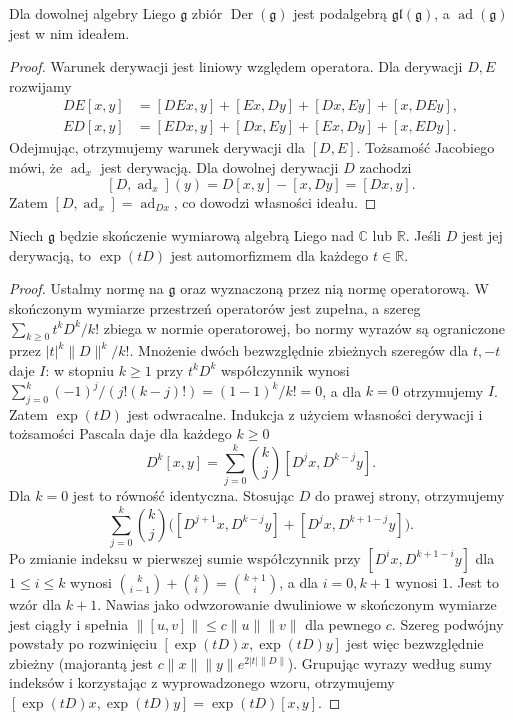 \begin{stwierdzenie}
\label{aa:prop:lie-derivations}
Dla dowolnej algebry Liego $\mathfrak g$ zbiór
$\operatorname{Der}(\mathfrak g)$ jest podalgebrą
$\mathfrak{gl}(\mathfrak g)$, a
$\operatorname{ad}(\mathfrak g)$ jest w nim ideałem.
\end{stwierdzenie}
\begin{proof}
Warunek derywacji jest liniowy względem operatora.
Dla derywacji $D,E$ rozwijamy
\[
\begin{aligned}
 DE[x,y]&=[DEx,y]+[Ex,Dy]+[Dx,Ey]+[x,DEy],\\
 ED[x,y]&=[EDx,y]+[Dx,Ey]+[Ex,Dy]+[x,EDy].
\end{aligned}
\]
Odejmując, otrzymujemy warunek derywacji dla $[D,E]$.
Tożsamość Jacobiego mówi, że $\operatorname{ad}_x$
jest derywacją. Dla dowolnej derywacji $D$ zachodzi
\[
 [D,\operatorname{ad}_x](y)=D[x,y]-[x,Dy]=[Dx,y].
\]
Zatem $[D,\operatorname{ad}_x]=\operatorname{ad}_{Dx}$,
co dowodzi własności ideału.
\end{proof}

\begin{stwierdzenie}
\label{aa:prop:exp-derivation}
Niech $\mathfrak g$ będzie skończenie wymiarową
algebrą Liego nad $\mathbb C$ lub $\mathbb R$.
Jeśli $D$ jest jej derywacją, to $\exp(tD)$ jest
automorfizmem dla każdego $t\in\mathbb R$.
\end{stwierdzenie}
\begin{proof}
Ustalmy normę na $\mathfrak g$ oraz wyznaczoną przez nią
normę operatorową. W skończonym wymiarze przestrzeń
operatorów jest zupełna, a szereg
$\sum_{k\ge0}t^kD^k/k!$ zbiega w normie operatorowej,
bo normy wyrazów są ograniczone przez
$|t|^k\|D\|^k/k!$. Mnożenie dwóch bezwzględnie
zbieżnych szeregów dla $t,-t$ daje $I$:
w stopniu $k\ge1$ przy $t^kD^k$ współczynnik wynosi
$\sum_{j=0}^k(-1)^j/(j!(k-j)!)=(1-1)^k/k!=0$,
a dla $k=0$ otrzymujemy $I$.
Zatem $\exp(tD)$ jest odwracalne.
Indukcja z użyciem własności derywacji i tożsamości
Pascala daje dla każdego $k\ge0$
\[
 D^k[x,y]=\sum_{j=0}^k\binom{k}{j}[D^jx,D^{k-j}y].
\]
Dla $k=0$ jest to równość identyczna. Stosując $D$
do prawej strony, otrzymujemy
\[
 \sum_{j=0}^k\binom{k}{j}
 \bigl([D^{j+1}x,D^{k-j}y]+[D^jx,D^{k+1-j}y]\bigr).
\]
Po zmianie indeksu w pierwszej sumie współczynnik
przy $[D^ix,D^{k+1-i}y]$ dla $1\le i\le k$
wynosi $\binom{k}{i-1}+\binom{k}{i}=\binom{k+1}{i}$,
a dla $i=0,k+1$ wynosi $1$. Jest to wzór dla $k+1$.
Nawias jako odwzorowanie dwuliniowe w skończonym
wymiarze jest ciągły i spełnia
$\|[u,v]\|\le c\|u\|\|v\|$ dla pewnego $c$.
Szereg podwójny powstały po rozwinięciu
$[\exp(tD)x,\exp(tD)y]$ jest więc bezwzględnie
zbieżny (majorantą jest $c\|x\|\|y\|e^{2|t|\|D\|}$).
Grupując wyrazy według sumy indeksów i korzystając
z wyprowadzonego wzoru, otrzymujemy
$[\exp(tD)x,\exp(tD)y]=\exp(tD)[x,y]$.
\end{proof}

